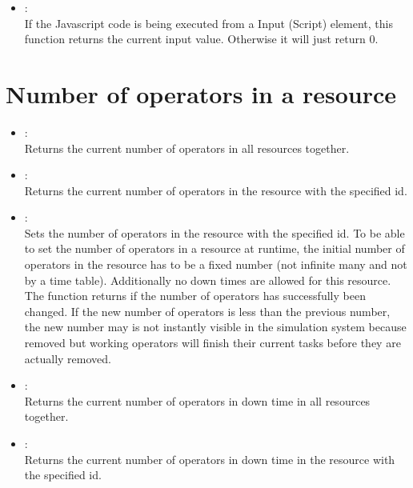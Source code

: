 \begin{itemize}

\item
{}:\\
If the Javascript code is being executed from a Input (Script) element,
this function returns the current input value. Otherwise it will just return  0. 

\end{itemize}

\section{Number of operators in a resource}

\begin{itemize}
	
\item
{}:\\
Returns the current number of operators in all resources together.
  
\item
{}:\\
Returns the current number of operators in the resource with the specified id.  
  
\item
{}:\\
Sets the number of operators in the resource with the specified id.
To be able to set the number of operators in a resource at runtime,
the initial number of operators in the resource has to be a fixed number
(not infinite many and not by a time table). Additionally no down times
are allowed for this resource.
The function returns  if the number of operators has successfully 
been changed. If the new number of operators is less than the previous number,
the new number may is not instantly visible in the simulation system because
removed but working operators will finish their current tasks before they are
actually removed.

\item
{}:\\
Returns the current number of operators in down time in all resources together.

\item
{}:\\
Returns the current number of operators in down time in the resource with the specified id.  
	
\end{itemize}

